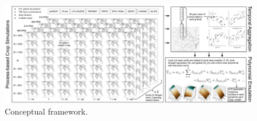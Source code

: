 \documentclass[gmd, manuscript]{copernicus} %
\begin{document}
\begin{figure}[ht]
\centering
   \includegraphics[width=17.5cm]{figures/flowchart.pdf}
   \caption{
   Conceptual framework. 
   }
   \label{fig:yearvclim}
\end{figure}


\end{document}
